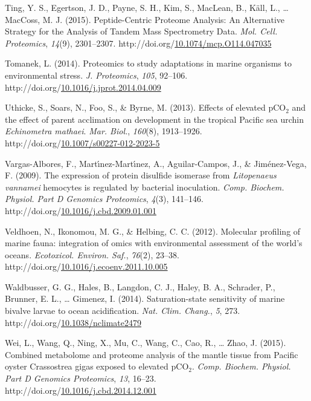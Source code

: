 \documentclass [11pt, proquest] {uwthesis}[2015/03/03]
\newlength{\cslhangindent}
\newenvironment{CSLReferences}%
{\setlength{\parindent}{0pt}%
\everypar{\setlength{\hangindent}{\cslhangindent}}\ignorespaces}%
{\par}
\begin{document}
\begin{CSLReferences}{1}{0}
\leavevmode\hypertarget{ref-Ting2015}{}%
Ting, Y. S., Egertson, J. D., Payne, S. H., Kim, S., MacLean, B., Käll, L., \ldots{} MacCoss, M. J. (2015). {Peptide-Centric Proteome Analysis: An Alternative Strategy for the Analysis of Tandem Mass Spectrometry Data}. \emph{Mol. Cell. Proteomics}, \emph{14}(9), 2301--2307. http://doi.org/\href{https://doi.org/10.1074/mcp.O114.047035}{10.1074/mcp.O114.047035}

\leavevmode\hypertarget{ref-Tomanek2014}{}%
Tomanek, L. (2014). {Proteomics to study adaptations in marine organisms to environmental stress}. \emph{J. Proteomics}, \emph{105}, 92--106. http://doi.org/\href{https://doi.org/10.1016/j.jprot.2014.04.009}{10.1016/j.jprot.2014.04.009}

\leavevmode\hypertarget{ref-Uthicke2013}{}%
Uthicke, S., Soars, N., Foo, S., \& Byrne, M. (2013). {Effects of elevated {pCO\(_2\)} and the effect of parent acclimation on development in the tropical Pacific sea urchin \emph{Echinometra mathaei}}. \emph{Mar. Biol.}, \emph{160}(8), 1913--1926. http://doi.org/\href{https://doi.org/10.1007/s00227-012-2023-5}{10.1007/s00227-012-2023-5}

\leavevmode\hypertarget{ref-Vargas-Albores2009}{}%
Vargas-Albores, F., Martı́nez-Martı́nez, A., Aguilar-Campos, J., \& Jiménez-Vega, F. (2009). {The expression of protein disulfide isomerase from \emph{Litopenaeus vannamei} hemocytes is regulated by bacterial inoculation}. \emph{Comp. Biochem. Physiol. Part D Genomics Proteomics}, \emph{4}(3), 141--146. http://doi.org/\href{https://doi.org/10.1016/j.cbd.2009.01.001}{10.1016/j.cbd.2009.01.001}

\leavevmode\hypertarget{ref-Veldhoen2012}{}%
Veldhoen, N., Ikonomou, M. G., \& Helbing, C. C. (2012). {Molecular profiling of marine fauna: integration of omics with environmental assessment of the world's oceans}. \emph{Ecotoxicol. Environ. Saf.}, \emph{76}(2), 23--38. http://doi.org/\href{https://doi.org/10.1016/j.ecoenv.2011.10.005}{10.1016/j.ecoenv.2011.10.005}

\leavevmode\hypertarget{ref-Waldbusser2014}{}%
Waldbusser, G. G., Hales, B., Langdon, C. J., Haley, B. A., Schrader, P., Brunner, E. L., \ldots{} Gimenez, I. (2014). {Saturation-state sensitivity of marine bivalve larvae to ocean acidification}. \emph{Nat. Clim. Chang.}, \emph{5}, 273. http://doi.org/\href{https://doi.org/10.1038/nclimate2479}{10.1038/nclimate2479}

\leavevmode\hypertarget{ref-Wei2015}{}%
Wei, L., Wang, Q., Ning, X., Mu, C., Wang, C., Cao, R., \ldots{} Zhao, J. (2015). {Combined metabolome and proteome analysis of the mantle tissue from Pacific oyster {Crassostrea gigas} exposed to elevated {pCO\(_2\)}}. \emph{Comp. Biochem. Physiol. Part D Genomics Proteomics}, \emph{13}, 16--23. http://doi.org/\href{https://doi.org/10.1016/j.cbd.2014.12.001}{10.1016/j.cbd.2014.12.001}


\end{CSLReferences}
\end{document}
